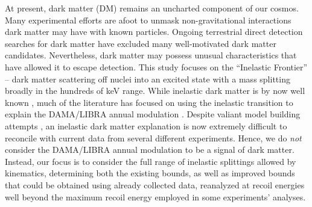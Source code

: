 \documentclass[11pt]{article}
\begin{document}
At present, dark matter (DM) remains an uncharted component of our cosmos. Many experimental efforts are afoot to unmask non-gravitational interactions dark matter may have with known particles. Ongoing terrestrial direct detection searches for dark matter have excluded many well-motivated dark matter candidates. Nevertheless, dark matter may possess unusual characteristics that have allowed it to escape detection. This study focuses on the ``Inelastic Frontier'' -- dark matter scattering off nuclei into an excited state with a mass splitting broadly in the hundreds of keV range.  
While inelastic dark matter is by now well known \cite{Hall:1997ah,TuckerSmith:2001hy,TuckerSmith:2004jv,Finkbeiner:2007kk,Arina:2007tm,Cui:2009xq,Fox:2010bu,An:2011uq, Pospelov:2013nea,Dienes:2014via,Barello:2014uda}, much 
of the literature has focused on using the inelastic
transition to explain the DAMA/LIBRA annual modulation \cite{TuckerSmith:2001hy,TuckerSmith:2004jv,Chang:2008gd,Cheung:2009qd,Graham:2010ca,Barello:2014uda}.
Despite valiant model building attempts \cite{ArkaniHamed:2008qn,Alves:2009nf,Lisanti:2009am,Chang:2010en,Schwetz:2011xm,Weiner:2012gm,Barello:2014uda}, an inelastic
dark matter explanation is now extremely difficult to reconcile with
current data from several different experiments.  Hence, 
we do \emph{not} consider the DAMA/LIBRA annual modulation 
to be a signal of dark matter.  Instead, our focus is to 
consider the full range of inelastic splittings allowed by
kinematics, determining both the existing bounds, as well as 
improved bounds that could be obtained using already collected data,
reanalyzed at recoil energies well beyond the maximum recoil energy employed in some experiments' analyses.  
\end{document}
